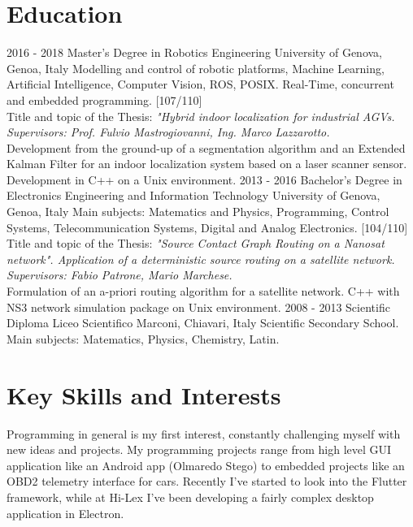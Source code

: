 \documentclass[]{friggeri-cv}
\begin{document}
\section{Education}
\begin{entrylist}
  \entry
    {2016 - 2018}
    {Master's Degree in Robotics Engineering}
    {University of Genova, Genoa, Italy}
    {Modelling and control of robotic platforms, Machine Learning, Artificial Intelligence, Computer Vision, ROS, POSIX. Real-Time, concurrent and embedded programming. [107/110]\\ Title and topic of the Thesis: 
    \emph{"Hybrid indoor localization for industrial AGVs. Supervisors: Prof. Fulvio Mastrogiovanni, Ing. Marco Lazzarotto.}\\ Development from the ground-up of a segmentation algorithm and an Extended Kalman Filter for an indoor localization system based on a laser scanner sensor. Development in C++ on a Unix environment.}
  \entry
    {2013 - 2016}
    {Bachelor's Degree in Electronics Engineering and Information Technology}
    {University of Genova, Genoa, Italy}
    {Main subjects: Matematics and Physics, Programming, Control Systems, Telecommunication Systems, Digital and Analog Electronics. [104/110]\\ Title and topic of the Thesis: 
    \emph{"Source Contact Graph Routing on a Nanosat network".
    Application of a deterministic source routing on a satellite network. Supervisors: Fabio Patrone, Mario Marchese.}\\ Formulation of an a-priori routing algorithm for a satellite network. C++ with NS3 network simulation package on Unix environment. }
  \entry
    {2008 - 2013}
    {Scientific Diploma}
    {Liceo Scientifico Marconi, Chiavari, Italy}
    {Scientific Secondary School.\\
    Main subjects: Matematics, Physics, Chemistry, Latin.}
\end{entrylist}

\clearpage
\section{Key Skills and Interests}
	Programming in general is my first interest, constantly challenging myself with new ideas and projects. My programming projects range from high level GUI application like an Android app (Olmaredo Stego) to embedded projects like an OBD2 telemetry interface for cars. Recently I've started to look into the Flutter framework, while at Hi-Lex I've been developing a fairly complex desktop application in Electron.
	
\end{document}

